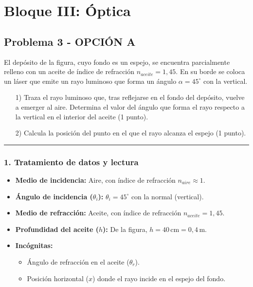 \newpage

\section{Bloque III: Óptica}
\label{sec:optica_2009_sep_ext}

\subsection{Problema 3 - OPCIÓN A}
\label{subsec:3A_2009_sep_ext}

\begin{cajaenunciado}
El depósito de la figura, cuyo fondo es un espejo, se encuentra parcialmente relleno con un aceite de índice de refracción $n_{aceite}=1,45$. En su borde se coloca un láser que emite un rayo luminoso que forma un ángulo $\alpha=45^{\circ}$ con la vertical.
\begin{enumerate}
    \item[1)] Traza el rayo luminoso que, tras reflejarse en el fondo del depósito, vuelve a emerger al aire. Determina el valor del ángulo que forma el rayo respecto a la vertical en el interior del aceite (1 punto).
    \item[2)] Calcula la posición del punto en el que el rayo alcanza el espejo (1 punto).
\end{enumerate}
\end{cajaenunciado}
\hrule

\subsubsection*{1. Tratamiento de datos y lectura}
\begin{itemize}
    \item \textbf{Medio de incidencia:} Aire, con índice de refracción $n_{aire} \approx 1$.
    \item \textbf{Ángulo de incidencia ($\theta_i$):} $\theta_i = 45^\circ$ con la normal (vertical).
    \item \textbf{Medio de refracción:} Aceite, con índice de refracción $n_{aceite} = 1,45$.
    \item \textbf{Profundidad del aceite ($h$):} De la figura, $h = 40 \, \text{cm} = 0,4 \, \text{m}$.
    \item \textbf{Incógnitas:}
        \begin{itemize}
            \item Ángulo de refracción en el aceite ($\theta_r$).
            \item Posición horizontal ($x$) donde el rayo incide en el espejo del fondo.
        \end{itemize}
\end{itemize}

